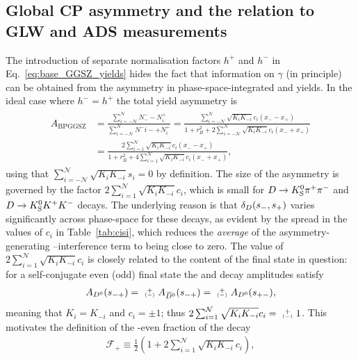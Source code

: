 
\subsection{Global CP asymmetry and the relation to GLW and ADS measurements} %
\label{sub:relation_to_glw_and_ads_measurements}



The introduction of separate normalisation factors $h^+$ and $h^-$ in Eq.~\eqref{eq:base_GGSZ_yields} hides the fact that information on $\gamma$ (in principle) can be obtained from the asymmetry in phase-space-integrated \Bp and \Bm yields. In the ideal case where $h^-=h^+$ the total yield asymmetry is 
\begin{align}\begin{split}\label{eq:A_GGSZ_global}
    A_\mathrm{BPGGSZ} &= \frac{\sum_{i=-\mathcal N}^{\mathcal N} N^-_- - N^+_i}{\sum_{i=-\mathcal N}^{\mathcal N} N^-i- + N^+_i}
    = \frac{ \sum_{i=-\mathcal N}^{\mathcal N} \sqrt{K_iK_{-i}}c_i (x_- - x_+)}{1 + r_B^2 +2 \sum_{i=-\mathcal N}^{\mathcal N} \sqrt{K_iK_{-i}}c_i (x_- + x_+)} \\
    &=\frac{2 \sum_{i=1}^{\mathcal N} \sqrt{K_iK_{-i}}c_i (x_- - x_+)}{1 + r_B^2 +4 \sum_{i=1}^{\mathcal N} \sqrt{K_iK_{-i}}c_i (x_- + x_+) },
\end{split}\end{align}
using that $\sum_{i=-\mathcal N}^{\mathcal N} \sqrt{K_iK_{-i}}s_i=0$ by definition. The size of the asymmetry is governed by the factor $2\sum_{i=1}^{\mathcal N} \sqrt{K_iK_{-i}}c_i$, which is small for ${{D}\rightarrow{\ensuremath{{K}^0_{\mathrm{S}}}}{\ensuremath{{\pi}^+}}{\ensuremath{{\pi}^-}}}$ and ${{D}\rightarrow{\ensuremath{{K}^0_{\mathrm{S}}}}{\ensuremath{{K}^+}}{\ensuremath{{K}^-}}}$ decays. The underlying reason is that $\delta_D(s_-, s_+)$ varies significantly across phase-space for these decays, as evident by the spread in the values of $c_i$ in Table~\ref{tab:cisi}, which reduces the \emph{average} of the asymmetry-generating \Dz--\Dzb interference term to being close to zero. The value of $2\sum_{i=1}^{\mathcal N} \sqrt{K_iK_{-i}}c_i$ is closely related to the \CP content of the final state in question: for a self-conjugate \CP even (odd) final state the \Dz and \Dzb decay amplitudes satisfy
\begin{align}
    {A_\Dz(\smp)=\varpm A_\Dzb(\smp)=\varpm A_\Dz(\spm)},
\end{align}
 meaning that $K_i=K_{-i}$ and $c_i=\pm1$; thus $2\sum_{i=1}^{\mathcal N} \sqrt{K_iK_{-i}}c_i= \varpm 1$. This motivates the definition of the \CP-even fraction of the decay
\begin{align}\label{eq:Fplus_global}
    \mathcal F_+ \equiv \frac{1}{2}\left(1 + 2\sum_{i=1}^{\mathcal N} \sqrt{K_i K_{-i}}c_i\right),
\end{align}
